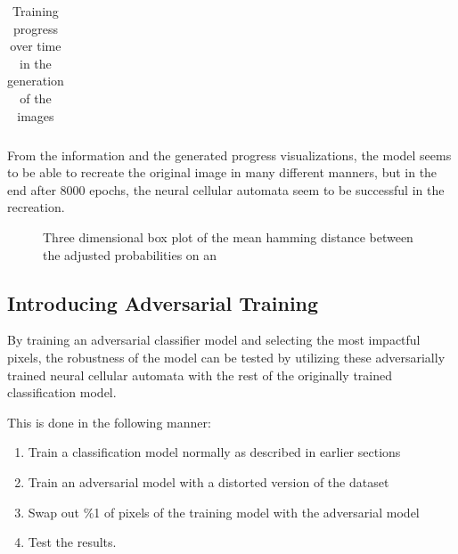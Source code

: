 \documentclass[conference]{IEEEtran}
\begin{document}
\begin{table}[ht]
\begin{tabular}{cc}
\end{tabular}
\caption{Training progress over time in the generation of the images}
\end{table}

From the information and the generated progress visualizations, the model seems to be able to recreate the original image in many different manners, but in the end after 8000 epochs, the neural cellular automata seem to be successful in the recreation. 


\begin{figure}[htbp]
\caption{Three dimensional box plot of the mean hamming distance between the adjusted probabilities on an }
\end{figure}

\subsection{Introducing Adversarial Training}

By training an adversarial classifier model and selecting the most impactful pixels, the robustness of the model can be tested by utilizing these adversarially trained neural cellular automata with the rest of the originally trained classification model. 

This is done in the following manner:
\begin{enumerate}
    \item Train a classification model normally as described in earlier sections
    \item Train an adversarial model with a distorted version of the dataset
    \item Swap out \%1 of pixels of the training model with the adversarial model
    \item Test the results.
\end{enumerate}
\end{document}

